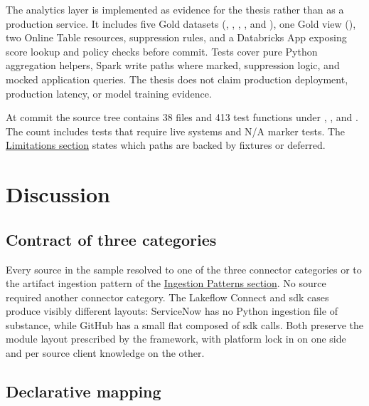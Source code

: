 The analytics layer is implemented as evidence for the thesis rather than as a production service. It includes five Gold datasets (, , , , and ), one Gold view (), two Online Table resources, suppression rules, and a Databricks App exposing score lookup and policy checks before commit. Tests cover pure Python aggregation helpers, Spark write paths where marked, suppression logic, and mocked application queries. The thesis does not claim production deployment, production latency, or model training evidence.

At commit  the source tree contains 38  files and 413 test functions under , , and . The count includes tests that require live systems and N/A marker tests. The \hyperref[sec:conclusion-limitations]{Limitations section} states which paths are backed by fixtures or deferred.


\section{Discussion}
\label{sec:impl-discussion}

\subsection{Contract of three categories}

Every source in the sample resolved to one of the three connector categories or to the artifact ingestion pattern of the \hyperref[sec:ingestion-patterns]{Ingestion Patterns section}. No source required another connector category. The Lakeflow Connect and \gls{sdk} cases produce visibly different layouts: ServiceNow has no Python ingestion file of substance, while GitHub has a small flat  composed of \gls{sdk} calls. Both preserve the module layout prescribed by the framework, with platform lock in on one side and per source client knowledge on the other.

\subsection{Declarative mapping}

